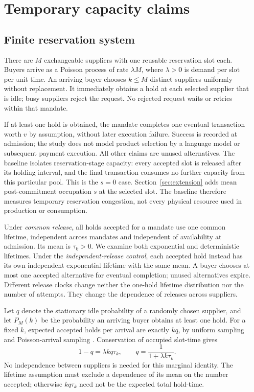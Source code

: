 \documentclass[11pt,a4paper]{article}
\begin{document}
\section{Temporary capacity claims}
\subsection{Finite reservation system}
There are $M$ exchangeable suppliers with one reusable reservation slot each. Buyers arrive as a Poisson process of rate $\lambda M$, where $\lambda>0$ is demand per slot per unit time. An arriving buyer chooses $k\leq M$ distinct suppliers uniformly without replacement. It immediately obtains a hold at each selected supplier that is idle; busy suppliers reject the request. No rejected request waits or retries within that mandate.

If at least one hold is obtained, the mandate completes one eventual transaction worth $v$ by assumption, without later execution failure. Success is recorded at admission; the study does not model product selection by a language model or subsequent payment execution. All other claims are unused alternatives. The baseline isolates reservation-stage capacity: every accepted slot is released after its holding interval, and the final transaction consumes no further capacity from this particular pool. This is the $s=0$ case. Section~\ref{sec:extension} adds mean post-commitment occupation $s$ at the selected slot. The baseline therefore measures temporary reservation congestion, not every physical resource used in production or consumption.

Under \emph{common release}, all holds accepted for a mandate use one common lifetime, independent across mandates and independent of availability at admission. Its mean is $\tau_k>0$. We examine both exponential and deterministic lifetimes. Under the \emph{independent-release control}, each accepted hold instead has its own independent exponential lifetime with the same mean. A buyer chooses at most one accepted alternative for eventual completion; unused alternatives expire. Different release clocks change neither the one-hold lifetime distribution nor the number of attempts. They change the dependence of releases across suppliers.

Let $q$ denote the stationary idle probability of a randomly chosen supplier, and let $P_M(k)$ be the probability an arriving buyer obtains at least one hold. For a fixed $k$, expected accepted holds per arrival are exactly $kq$, by uniform sampling and Poisson-arrival sampling \citep{wolff}. Conservation of occupied slot-time gives
\begin{equation}
 1-q=\lambda kq\tau_k,\qquad
 q=\frac{1}{1+\lambda k\tau_k}.\label{eq:exactq}
\end{equation}
No independence between suppliers is needed for this marginal identity. The lifetime assumption must exclude a dependence of its mean on the number accepted; otherwise $kq\tau_k$ need not be the expected total hold-time.
\end{document}
